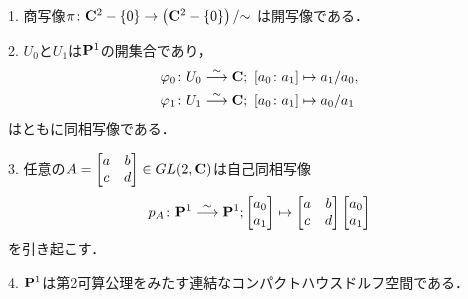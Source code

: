 \begin{Lemma}\label{mnf:p1}
    1. 
    商写像$\pi \colon \mathbf{C}^{2}-\{0\}
    \rightarrow\left(\mathbf{C}^{2}-\{0\}\right)/{\sim}$
    は開写像である．

    2. 
    $U_0$と$U_1$は$\mathbf{P}^1$の開集合であり，
    \begin{align*}
        \pphi_0&\colon U_0\overset{{\sim}}{\longrightarrow}\cc;\ [a_0\colon a_1]\mapsto a_1/a_0,\\
        \pphi_1&\colon U_1\overset{{\sim}}{\longrightarrow}\cc;\ [a_0\colon a_1]\mapsto a_0/a_1
    \end{align*}
    はともに同相写像である．

    3. 
    任意の$\displaystyle A = \begin{bmatrix}
        a&b\\c&d
    \end{bmatrix}\in GL(2,\mathbf{C})$は自己同相写像
    \begin{align*}
        p_A\colon \mathbf{P}^1\overset{{\sim}}{\longrightarrow}\mathbf{P}^1;
        \begin{bmatrix}
            a_0\\a_1
        \end{bmatrix}
        \mapsto
        \begin{bmatrix}
            a&b\\c&d
        \end{bmatrix}
        \begin{bmatrix}
            a_0\\a_1
        \end{bmatrix}
    \end{align*}
    を引き起こす．

    4. 
    $\mathbf{P}^1$は第2可算公理をみたす連結なコンパクトハウスドルフ空間である．
\end{Lemma}

